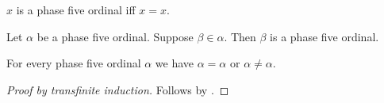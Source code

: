 \begin{definition}\label{phase5_ordinal_guard}
    $x$ is a phase five ordinal iff $x=x$.
\end{definition}

\begin{axiom}\label{phase5_ordinal_guard_hereditary}
    Let $\alpha$ be a phase five ordinal.
    Suppose $\beta\in\alpha$.
    Then $\beta$ is a phase five ordinal.
\end{axiom}

\begin{proposition}\label{phase5_transfinite_induction}
    For every phase five ordinal $\alpha$ we have $\alpha=\alpha$ or $\alpha\neq\alpha$.
\end{proposition}
\begin{proof}[Proof by transfinite induction]
    Follows by \auto.
\end{proof}
